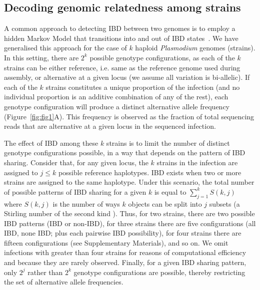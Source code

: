 \documentclass[9pt,lineno]{elife}
\begin{document}
\subsection{Decoding genomic relatedness among strains}

A common approach to detecting IBD between two genomes is to employ a hidden Markov Model that transitions into and out of IBD states~\citep{Chang2015, Gusev2009, Gusev2011}.  We have generalised this approach for the case of $k$ haploid {\it Plasmodium} genomes (strains). In this setting, there are $2^k$ possible genotype configurations, as each of the $k$ strains can be either reference, i.e. same as the reference genome used during assembly, or alternative at a given locus (we assume all variation is bi-allelic). If each of the $k$ strains constitutes a unique proportion of the infection (and no individual proportion is an additive combination of any of the rest), each genotype configuration will produce a distinct alternative allele frequency (Figure~\ref{fig:fig1}A). This frequency is observed as the fraction of total sequencing reads that are alternative at a given locus in the sequenced infection.

The effect of IBD among these $k$ strains is to limit the number of distinct genotype configurations possible, in a way that depends on the pattern of IBD sharing. Consider that, for any given locus, the $k$ strains in the infection are assigned to $j \leq k$ possible reference haplotypes. IBD exists when two or more strains are assigned to the same haplotype. Under this scenario, the total number of possible patterns of IBD sharing for a given $k$ is equal to $\sum_{j=1}^{k} S(k,j)$ where $S(k,j)$ is the number of ways $k$ objects can be split into $j$ subsets (a Stirling number of the second kind \citep{Ronald1988}). Thus, for two strains, there are two possible IBD patterns (IBD or non-IBD), for three strains there are five configurations (all IBD, none IBD; plus each pairwise IBD possibility), for four strains there are fifteen configurations (see Supplementary Materials), and so on. We omit infections with greater than four strains for reasons of computational efficiency and because they are rarely observed. Finally, for a given IBD sharing pattern, only $2^j$ rather than $2^k$ genotype configurations are possible, thereby restricting the set of alternative allele frequencies.
\end{document}
